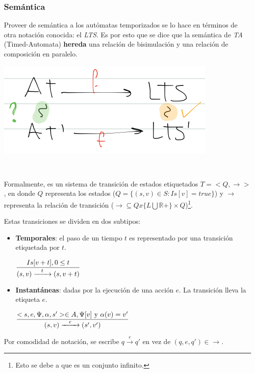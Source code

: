 \documentclass[]{article}
\begin{document}
\subsubsection{Semántica}
Proveer de semántica a los autómatas temporizados se lo hace en términos de otra notación conocida: el \textit{LTS}. Es por esto que se dice que la semántica de \textit{TA} (Timed-Automata) \textbf{hereda} una relación de bisimulación y una relación de composición en paralelo.

\begin{center}
	\includegraphics[scale=0.6]{AuTemp.png}
\end{center}

~\newline

Formalmente, es un sistema de transición de estados etiquetados $T=<Q,\rightarrow>$, en donde $Q$ representa los estados ($Q=\{(s,v)\in S : Is[v]=true\}$) y $\rightarrow$ representa la relación de transición ($\rightarrow \subseteq Q x \{L \bigcup \mathbb{R}+\} \times Q$)\footnote{Esto se debe a que es un conjunto infinito.}.

Estas transiciones se dividen en dos subtipos:
\begin{itemize}
	\item \textbf{Temporales}: el paso de un tiempo $t$ es representado por una transición etiquetada por $t$.
	\begin{center}
		$\displaystyle \frac{Is[v+t], 0\leq t}{(s,v)\xrightarrow{\hspace*{0.3cm} t \hspace*{0.3cm}} (s,v+t)}$
	\end{center}
	\item \textbf{Instantáneas}: dadas por la ejecución de una acción $e$. La transición lleva la etiqueta $e$.
	\begin{center}
		$\displaystyle \frac{<s,e,\Psi,\alpha,s'>\in A, \Psi[v] \text{ y } \alpha(v)=v'}{(s,v)\xrightarrow{\hspace*{0.3cm} e \hspace*{0.3cm}} (s',v')}$
	\end{center}
\end{itemize}

Por comodidad de notación, se escribe $q \overset{e}{\rightarrow} q'$ en vez de $(q,e,q')\in\rightarrow$.
\end{document}
